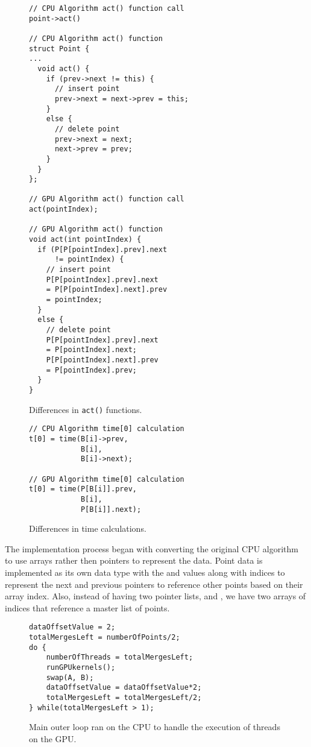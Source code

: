 \documentclass{article}
\begin{document}
\begin{figure}
\begin{lstlisting}
// CPU Algorithm act() function call
point->act()

// CPU Algorithm act() function
struct Point {
...
  void act() {  
    if (prev->next != this) {
      // insert point 
      prev->next = next->prev = this;
    }
    else { 
      // delete point
      prev->next = next; 
      next->prev = prev; 
    }
  }
};

// GPU Algorithm act() function call
act(pointIndex);

// GPU Algorithm act() function
void act(int pointIndex) {
  if (P[P[pointIndex].prev].next 
      != pointIndex) {   
    // insert point
    P[P[pointIndex].prev].next 
    = P[P[pointIndex].next].prev 
    = pointIndex;
  }
  else { 
    // delete point
    P[P[pointIndex].prev].next 
    = P[pointIndex].next;
    P[P[pointIndex].next].prev 
    = P[pointIndex].prev;
  }	
}	
\end{lstlisting}	
\caption{Differences in \texttt{act()} functions.}
\label{act_functions}
\end{figure}

\begin{figure}
\begin{lstlisting}
// CPU Algorithm time[0] calculation
t[0] = time(B[i]->prev, 
            B[i], 
            B[i]->next);

// GPU Algorithm time[0] calculation
t[0] = time(P[B[i]].prev, 
            B[i], 
            P[B[i]].next);
\end{lstlisting}
\caption{Differences in time calculations.}
\label{time_calculations}
\end{figure}

The implementation process began with converting the original CPU algorithm to use arrays rather then pointers to represent the data. Point data is implemented as its own data type with the  and  values along with indices to represent the next and previous pointers to reference other points based on their array index. Also, instead of having two pointer lists,  and , we have two arrays of indices that reference a master list  of points. 

\begin{figure}
\begin{lstlisting}
dataOffsetValue = 2;
totalMergesLeft = numberOfPoints/2;
do {
    numberOfThreads = totalMergesLeft;
    runGPUkernels();
    swap(A, B);
    dataOffsetValue = dataOffsetValue*2;
    totalMergesLeft = totalMergesLeft/2;
} while(totalMergesLeft > 1);
\end{lstlisting}
\caption{Main outer loop ran on the CPU to handle the execution of threads on the GPU.}
\label{main_loop_figure}
\end{figure}
\end{document}
